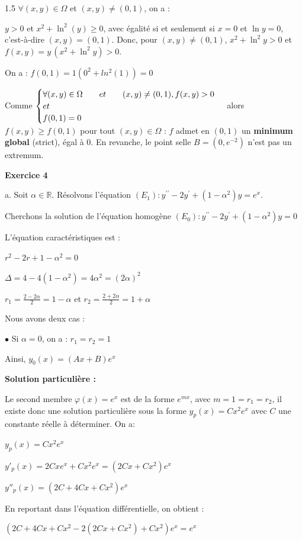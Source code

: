\documentclass[12pt]{article}
\begin{document}
\begin{spacing}{1.5}
$\forall (x,y)\in\Omega$ et $(x,y)\neq(0,1)$, on a :

$y>0$ et $x^2+\ln^2(y)\ge0$, avec égalité si et seulement si $x=0$ et $\ln y=0$, c'est-à-dire $(x,y)=(0,1)$. Donc, pour $(x,y)\neq(0,1)$, $x^2+\ln^2y>0$ et $f(x,y)=y\,(x^2+\ln^2y)>0$.

\medskip
On a : $f(0,1)=1(0^2+ln^2(1))=0$

Comme $\begin{cases}
\forall (x,y)\in\Omega\hspace{0.7cm} et\hspace{0.7cm} (x,y)\neq(0,1), f(x,y)>0\\
et\\
f(0,1)=0
\end{cases}$ alors $f(x,y)\ge f(0,1)$ pour tout $(x,y)\in\Omega$ : $f$ admet en $(0,1)$ un \textbf{minimum global} (strict), égal à $0$. En revanche, le point selle $B=(0,e^{-2})$ n'est pas un extremum.

\medskip\textbf{Exercice 4}

a. Soit $\alpha\in \mathbb{R}$. Résolvons l'équation $(E_1):y^{\prime\prime} -2y^{\prime} +(1-\alpha^2)y=e^x$.

Cherchons la solution de l'équation homogène $(E_0) : y^{\prime\prime} -2y^{\prime} +(1-\alpha^2)y=0$

L'équation caractéristiques est :

$r^2-2r+1-\alpha^2=0$

$\Delta = 4-4(1-\alpha^2)=4\alpha^2=(2\alpha)^2$

$r_1=\frac{2-2\alpha}{2}=1-\alpha$ et $r_2=\frac{2+2\alpha}{2}=1+\alpha$

Nous avons deux cas :

$\bullet$ Si $\alpha=0$, on a : $r_1=r_2=1$

Ainsi, $y_0(x)=(Ax+B)e^x$

\textbf{Solution particulière :}

Le second membre $\varphi (x)=e^x$ est de la forme $e^{mx}$, avec  $m=1=r_1=r_2$, il existe donc une solution particulière sous la forme $y_p(x)=Cx^2e^x$ avec $C$ une constante réelle à déterminer. On a:

$y_p(x)=Cx^2e^x$

$y'_p(x)=2Cxe^x+Cx^2e^x=(2Cx+Cx^2)e^x$

$y''_p(x)=(2C+4Cx+Cx^2)e^x$

En reportant dans l'équation différentielle, on obtient :

$(2C+4Cx+Cx^2-2(2Cx+Cx^2)+Cx^2)e^x=e^x$


\end{spacing}
\end{document}
